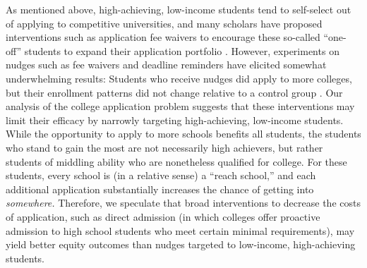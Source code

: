 As mentioned above, high-achieving, low-income students tend to self-select out of applying to competitive universities, and many scholars have proposed interventions such as application fee waivers to encourage these so-called  ``one-off'' students to expand their application portfolio \cite{hoxbyandavery2012,hoxbyandturner2013}. However, experiments on nudges such as fee waivers and deadline reminders have elicited somewhat underwhelming results: Students who receive nudges did apply to more colleges, but their enrollment patterns did not change relative to a control group \cite{gurantzetal2021}. Our analysis of the college application problem suggests that these interventions may limit their efficacy by narrowly targeting high-achieving, low-income students. While the opportunity to apply to more schools benefits all students, the students who stand to gain the most are not necessarily high achievers, but rather students of middling ability who are nonetheless qualified for college. For these students, every school is (in a relative sense) a ``reach school,'' and each additional application substantially increases the chance of getting into \emph{somewhere.} Therefore, we speculate that broad interventions to decrease the costs of application, such as direct admission \cite{jaschik2022} (in which colleges offer proactive admission to high school students who meet certain minimal requirements), may yield better equity outcomes than nudges targeted to low-income, high-achieving students.






